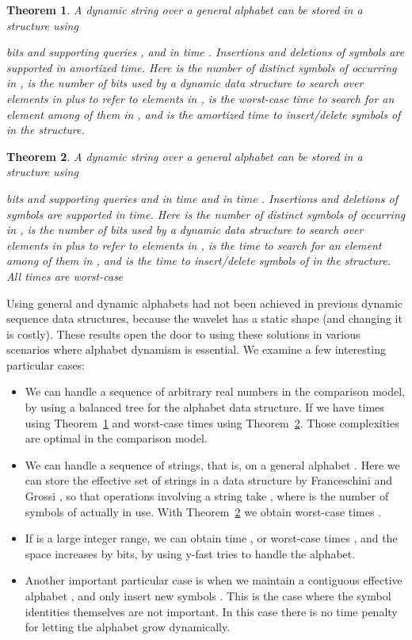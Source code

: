 \documentclass[11pt]{article}
\newtheorem{theorem}{Theorem}
\begin{document}
\begin{theorem}
\label{thm:general}
A dynamic string  over a general alphabet  
can be stored in a structure using 
 
bits and supporting queries
,  and  in time 
.
Insertions and deletions of symbols 
are supported in  amortized 
time. 
Here  is the number of distinct symbols of  occurring in ,
 is the number of bits used by a dynamic data structure 
to search over  elements in  plus to refer to  
elements in ,  is the worst-case time to search 
for an element among  of them in , and 
is the amortized time to insert/delete symbols of  in the structure.
\end{theorem}

\begin{theorem}
\label{thm:generalwc}
A dynamic string  over a general alphabet  
can be stored in a structure using 
 
bits and supporting queries
 and  in time  and
 in time .
Insertions and deletions of symbols 
are supported in  time. 
Here  is the number of distinct symbols of  occurring in ,
 is the number of bits used by a dynamic data structure 
to search over  elements in  plus to refer to  
elements in ,  is the time to search 
for an element among  of them in , and 
is the time to insert/delete symbols of  in the structure.
All times are worst-case
\end{theorem}

Using general and dynamic alphabets had not been achieved in previous 
dynamic sequence data structures, because the wavelet has a static shape
(and changing it is costly). These results open the door to using
these solutions in various scenarios where alphabet dynamism is essential.
We examine a few interesting particular cases:

\begin{itemize} 
\item 
We can handle a sequence of arbitrary real numbers in the comparison model,
by using a balanced tree for the alphabet data structure.
If  we have 
times using Theorem~\ref{thm:general} and  worst-case times using
Theorem~\ref{thm:generalwc}. Those complexities are optimal in the comparison
model.
\item 
We can handle a sequence of strings, that is,
 on a general alphabet
. Here we can store the effective set of strings in a data structure 
by Franceschini and Grossi \cite{FG04}, so that operations involving a string 
 take ,
where  is the number of symbols of  actually in use.
With Theorem~\ref{thm:generalwc} we obtain worst-case times 
.
\item
If  is a large integer range, we can obtain time
, or worst-case times 
, and the space increases by  bits, 
by using y-fast tries \cite{Wil83} to handle the alphabet.
\item
Another important particular case is when we maintain a contiguous effective
alphabet , and only insert new symbols . This is the case
where the symbol identities themselves are not important. In this case
there is no time penalty for letting the alphabet grow dynamically.
\end{itemize}
\end{document}
